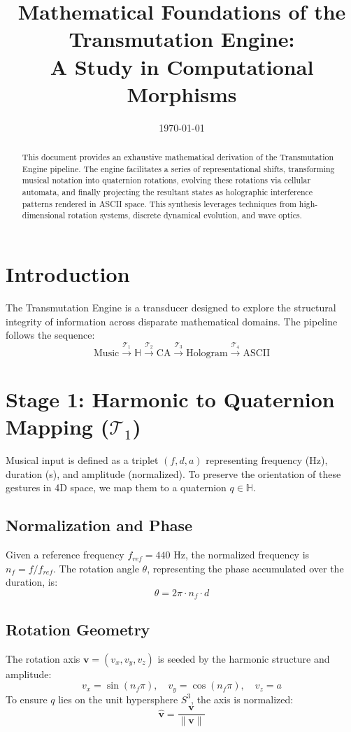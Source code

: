 \documentclass[11pt,a4paper]{article}
\title{Mathematical Foundations of the Transmutation Engine: \\ A Study in Computational Morphisms}
\date{\today}
\begin{document}
\maketitle

\begin{abstract}
This document provides an exhaustive mathematical derivation of the Transmutation Engine pipeline. The engine facilitates a series of representational shifts, transforming musical notation into quaternion rotations, evolving these rotations via cellular automata, and finally projecting the resultant states as holographic interference patterns rendered in ASCII space. This synthesis leverages techniques from high-dimensional rotation systems, discrete dynamical evolution, and wave optics.
\end{abstract}

\section{Introduction}
The Transmutation Engine is a transducer designed to explore the structural integrity of information across disparate mathematical domains. The pipeline follows the sequence:
\[ \text{Music} \xrightarrow{\mathcal{T}_1} \mathbb{H} \xrightarrow{\mathcal{T}_2} \text{CA} \xrightarrow{\mathcal{T}_3} \text{Hologram} \xrightarrow{\mathcal{T}_4} \text{ASCII} \]

\section{Stage 1: Harmonic to Quaternion Mapping ($\mathcal{T}_1$)}
Musical input is defined as a triplet $(f, d, a)$ representing frequency (Hz), duration (s), and amplitude (normalized). To preserve the orientation of these gestures in 4D space, we map them to a quaternion $q \in \mathbb{H}$.

\subsection{Normalization and Phase}
Given a reference frequency $f_{ref} = 440$ Hz, the normalized frequency is $n_f = f/f_{ref}$. The rotation angle $\theta$, representing the phase accumulated over the duration, is:
\[ \theta = 2\pi \cdot n_f \cdot d \]

\subsection{Rotation Geometry}
The rotation axis $\mathbf{v} = (v_x, v_y, v_z)$ is seeded by the harmonic structure and amplitude:
\[ v_x = \sin(n_f \pi), \quad v_y = \cos(n_f \pi), \quad v_z = a \]
To ensure $q$ lies on the unit hypersphere $S^3$, the axis is normalized:
\[ \hat{\mathbf{v}} = \frac{\mathbf{v}}{\|\mathbf{v}\|} \]
\end{document}
